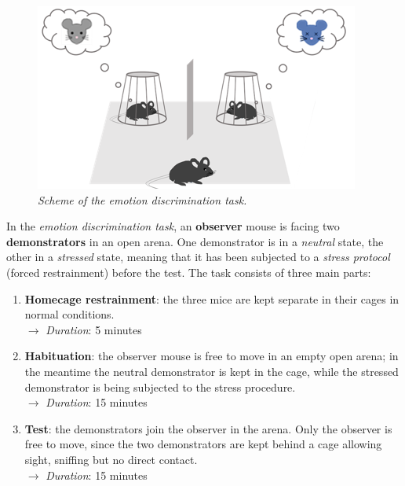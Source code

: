 \documentclass[12pt, a4paper]{article}
\begin{document}
\begin{figure}[H]
	\begin{center}
		\includegraphics[scale=.90]{emotion_discrimination.png} 
	\end{center} 
	\caption{\textit{Scheme of the emotion discrimination task.}}
	
\end{figure}

In the \textit{emotion discrimination task}, an \textbf{observer} mouse is facing two \textbf{demonstrators} in an open arena. One demonstrator is in a \textit{neutral} state, the other in a \textit{stressed} state, meaning that it has been subjected to a \textit{stress protocol} (forced restrainment) before the test. The task consists of three main parts:

\begin{enumerate}
	
	\item \textbf{Homecage restrainment}: the three mice are kept separate in their cages in normal conditions. \\
	$\longrightarrow$ \textit{Duration}: 5 minutes
	
	\item \textbf{Habituation}: the observer mouse is free to move in an empty open arena; in the meantime the neutral demonstrator is kept in the cage, while the stressed demonstrator is being subjected to the stress procedure. \\
	$\longrightarrow$  \textit{Duration}: 15 minutes
	
	\item \textbf{Test}: the demonstrators join the observer in the arena. Only the observer is free to move, since the two demonstrators are kept behind a cage allowing sight, sniffing but no direct contact. \\
	$\longrightarrow$  \textit{Duration}: 15 minutes
\end{enumerate}
\end{document}
